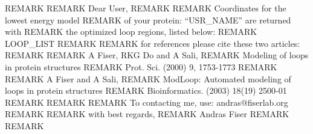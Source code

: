 REMARK 
REMARK  Dear User,
REMARK    
REMARK  Coordinates for the lowest energy model 
REMARK  of your protein: ``USR_NAME''  are returned with 
REMARK  the optimized loop regions, listed below: 
REMARK  LOOP_LIST
REMARK     
REMARK  for references please cite these two articles:
REMARK
REMARK     A Fiser, RKG Do and A Sali, 
REMARK     Modeling of loops in protein structures
REMARK     Prot. Sci. (2000) 9, 1753-1773
REMARK
REMARK     A Fiser and A Sali,
REMARK     ModLoop: Automated modeling of loops in protein structures
REMARK     Bioinformatics. (2003) 18(19) 2500-01
REMARK
REMARK
REMARK  To contacting me, use:  andras@fiserlab.org
REMARK     
REMARK  with best regards,
REMARK  Andras Fiser
REMARK
REMARK
